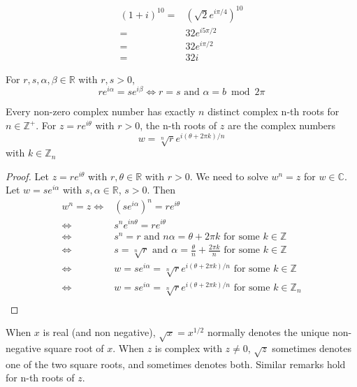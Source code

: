 
\begin{exmp}
\begin{align*}
    (1+i)^10 = & (\sqrt{2} e^{i\pi /4})^{10} \\
    = & 32 e^{i5\pi /2}\\
    = & 32 e^{i\pi /2}\\
    = & 32 i
\end{align*}
\end{exmp}

\begin{note}
For $r,s,\alpha,\beta \in \mathbb{R}$ with $r,s>0$,
\[re^{i\alpha} = se^{i\beta} \Longleftrightarrow r=s \text{ and } \alpha = b \bmod 2\pi\]
\end{note}

\begin{thm}
Every non-zero complex number has exactly $n$ distinct complex n-th roots for $n \in \mathbb{Z}^+$. For $z = re^{i\theta}$ with $r>0$, the n-th roots of $z$ are the complex numbers \[w = \sqrt[n]{r} e^{i(\theta + 2\pi k) / n}\] with $k\in\mathbb{Z}_n$
\end{thm}

\begin{proof}
Let $z = re^{i\theta}$ with $r,\theta \in \mathbb{R}$ with $r>0$. We need to solve $w^n = z$ for $w\in\mathbb{C}$. Let $w = se^{i\alpha}$ with $s,\alpha \in \mathbb{R}$, $s > 0$. Then
\begin{align*}
    w^n = z \Longleftrightarrow & (se^{i\alpha})^n = re^{i\theta} \\
    \Longleftrightarrow & s^ne^{in\theta} = re^{i\theta} \\
    \Longleftrightarrow & s^n = r \text{ and } n\alpha = \theta + 2\pi k \text{ for some } k\in\mathbb{Z}\\
    \Longleftrightarrow & s = \sqrt[n]{r} \text{ and } \alpha = \frac{\theta }{n} + \frac{2\pi k}{n}\text{ for some } k\in\mathbb{Z}\\
    \Longleftrightarrow & w = se^{i\alpha} = \sqrt[n]{r}e^{i(\theta + 2\pi k) / n} \text{ for some }k\in \mathbb{Z} \\
    \Longleftrightarrow & w = se^{i\alpha} = \sqrt[n]{r}e^{i(\theta + 2\pi k) / n} \text{ for some }k\in \mathbb{Z}_n \\
\end{align*}
\end{proof}

\begin{nota}
When $x$ is real (and non negative), $\sqrt{x} = x^{1/2}$ normally denotes the unique non-negative square root of $x$. When $z$ is complex with $z\neq 0$, $\sqrt{z}$ sometimes denotes one of the two square roots, and sometimes denotes both. Similar remarks hold for n-th roots of $z$.
\end{nota}

